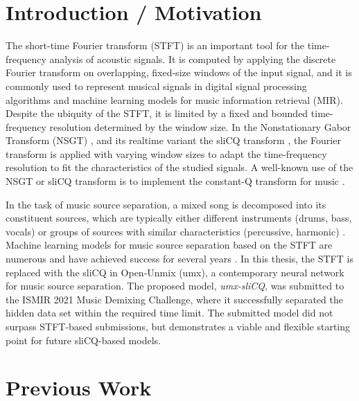 \documentclass[letter,12pt]{scrartcl}
\title{\ThesisTitle}
\author{Sevag Hanssian, sevag.hanssian@mail.mcgill.ca}
\begin{document}
\maketitle

\section{Introduction / Motivation}

The short-time Fourier transform (STFT) is an important tool for the time-frequency analysis of acoustic signals. It is computed by applying the discrete Fourier transform on overlapping, fixed-size windows of the input signal, and it is commonly used to represent musical signals in digital signal processing algorithms and machine learning models for music information retrieval (MIR). Despite the ubiquity of the STFT, it is limited by a fixed and bounded time-frequency resolution determined by the window size. In the Nonstationary Gabor Transform (NSGT) \cite{balazs}, and its realtime variant the sliCQ transform \cite{invertiblecqt}, the Fourier transform is applied with varying window sizes to adapt the time-frequency resolution to fit the characteristics of the studied signals. A well-known use of the NSGT or sliCQ transform is to implement the constant-Q transform for music \cite{jbrown, klapuricqt}.

In the task of music source separation, a mixed song is decomposed into its constituent sources, which are typically either different instruments (drums, bass, vocals) or groups of sources with similar characteristics (percussive, harmonic) \cite{musicsepgood}. Machine learning models for music source separation based on the STFT are numerous and have achieved success for several years \cite{sisec2018}. In this thesis, the STFT is replaced with the sliCQ in Open-Unmix (umx), a contemporary neural network \cite{umx} for music source separation. The proposed model, \textit{umx-sliCQ}, was submitted to the ISMIR 2021 Music Demixing Challenge, where it successfully separated the hidden data set within the required time limit. The submitted model did not surpass STFT-based submissions, but demonstrates a viable and flexible starting point for future sliCQ-based models.

\section{Previous Work}
\end{document}

